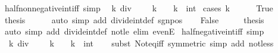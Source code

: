 \begin{isabellebody}
\isanewline
{}\isamarkupfalse%
\ half{\isacharunderscore}{\kern0pt}nonnegative{\isacharunderscore}{\kern0pt}int{\isacharunderscore}{\kern0pt}iff\ {\isacharbrackleft}{\kern0pt}simp{\isacharbrackright}{\kern0pt}{\isacharcolon}{\kern0pt}\isanewline
\ \ {\isacartoucheopen}k\ div\ {}\ {\isasymge}\ {}\ {\isasymlongleftrightarrow}\ k\ {\isasymge}\ {}{\isacartoucheclose}\ \ k\ {\isacharcolon}{\kern0pt}{\isacharcolon}{\kern0pt}\ int\isanewline
%
\isadelimproof
%
\endisadelimproof
%
\isatagproof
{}\isamarkupfalse%
\ {\isacharparenleft}{\kern0pt}cases\ {\isacartoucheopen}k\ {\isasymge}\ {}{\isacartoucheclose}{\isacharparenright}{\kern0pt}\isanewline
\ \ \isamarkupfalse%
\ True\isanewline
\ \ \isamarkupfalse%
\ \isamarkupfalse%
\ {\isacharquery}{\kern0pt}thesis\isanewline
\ \ \ \ \isamarkupfalse%
\ {\isacharparenleft}{\kern0pt}auto\ simp\ add{\isacharcolon}{\kern0pt}\ divide{\isacharunderscore}{\kern0pt}int{\isacharunderscore}{\kern0pt}def\ sgn{\isacharunderscore}{\kern0pt}{}{\isacharunderscore}{\kern0pt}pos{\isacharparenright}{\kern0pt}\isanewline
{}\isamarkupfalse%
\isanewline
\ \ \isamarkupfalse%
\ False\isanewline
\ \ \isamarkupfalse%
\ \isamarkupfalse%
\ {\isacharquery}{\kern0pt}thesis\isanewline
\ \ \ \ \isamarkupfalse%
\ {\isacharparenleft}{\kern0pt}auto\ simp\ add{\isacharcolon}{\kern0pt}\ divide{\isacharunderscore}{\kern0pt}int{\isacharunderscore}{\kern0pt}def\ not{\isacharunderscore}{\kern0pt}le\ elim{\isacharbang}{\kern0pt}{\isacharcolon}{\kern0pt}\ evenE{\isacharparenright}{\kern0pt}\isanewline
{}\isamarkupfalse%
%
\endisatagproof
{\isafoldproof}%
%
\isadelimproof
\isanewline
%
\endisadelimproof
\isanewline
{}\isamarkupfalse%
\ half{\isacharunderscore}{\kern0pt}negative{\isacharunderscore}{\kern0pt}int{\isacharunderscore}{\kern0pt}iff\ {\isacharbrackleft}{\kern0pt}simp{\isacharbrackright}{\kern0pt}{\isacharcolon}{\kern0pt}\isanewline
\ \ {\isacartoucheopen}k\ div\ {}\ {\isacharless}{\kern0pt}\ {}\ {\isasymlongleftrightarrow}\ k\ {\isacharless}{\kern0pt}\ {}{\isacartoucheclose}\ \ k\ {\isacharcolon}{\kern0pt}{\isacharcolon}{\kern0pt}\ int\isanewline
%
\isadelimproof
\ \ %
\endisadelimproof
%
\isatagproof
{}\isamarkupfalse%
\ {\isacharparenleft}{\kern0pt}subst\ Not{\isacharunderscore}{\kern0pt}eq{\isacharunderscore}{\kern0pt}iff\ {\isacharbrackleft}{\kern0pt}symmetric{\isacharbrackright}{\kern0pt}{\isacharparenright}{\kern0pt}\ {\isacharparenleft}{\kern0pt}simp\ add{\isacharcolon}{\kern0pt}\ not{\isacharunderscore}{\kern0pt}less{\isacharparenright}{\kern0pt}%

\end{isabellebody}
